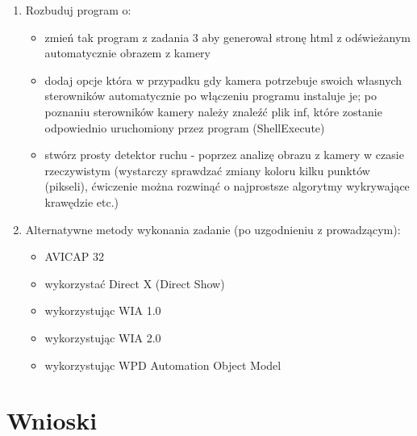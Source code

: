 \documentclass[a4paper,12pt]{extarticle}  %
\begin{document}
\begin{enumerate}
\begin{itemize}
	      \end{itemize}
	\item Rozbuduj program o:
	      \begin{itemize}
		      \item zmień tak program z zadania 3 aby generował stronę html z odświeżanym automatycznie obrazem z kamery
		      \item dodaj opcje która w przypadku gdy kamera potrzebuje swoich własnych sterowników automatycznie po włączeniu programu instaluje je; po poznaniu sterowników kamery należy znaleźć plik inf, które zostanie odpowiednio uruchomiony przez program (ShellExecute)
		      \item stwórz prosty detektor ruchu - poprzez analizę obrazu z kamery w czasie rzeczywistym (wystarczy sprawdzać zmiany koloru kilku punktów (pikseli), ćwiczenie można rozwinąć o najprostsze algorytmy wykrywające krawędzie etc.)
	      \end{itemize}
	\item Alternatywne metody wykonania zadanie (po uzgodnieniu z prowadzącym):
	      \begin{itemize}
		      \item AVICAP 32
		      \item wykorzystać Direct X (Direct Show)
		      \item wykorzystując WIA 1.0
		      \item wykorzystując WIA 2.0
		      \item wykorzystując WPD Automation Object Model
	      \end{itemize}
\end{enumerate}
\section{Wnioski}
\end{document}
